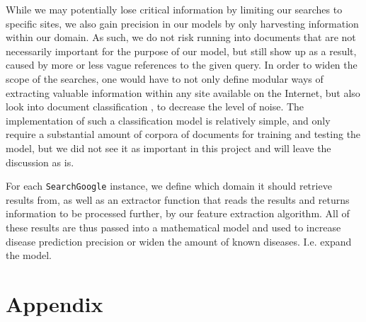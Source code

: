 \documentclass[10pt,letterpaper,final]{article}
\begin{document}
While we may potentially lose critical information by limiting our
searches to specific sites, we also gain precision in our models by only
harvesting information within our domain. As such, we do not risk
running into documents that are not necessarily important for the
purpose of our model, but still show up as a result, caused by more or
less vague references to the given query. In order to widen the scope of
the searches, one would have to not only define modular ways of
extracting valuable information within any site available on the
Internet, but also look into document classification \cite{Jimmy}, to
decrease the level of noise. The implementation of such a classification
model is relatively simple, and only require a substantial amount of
corpora of documents for training and testing the model, but we did not
see it as important in this project and will leave the discussion as is.


For each \texttt{SearchGoogle} instance, we define which domain it
should retrieve results from, as well as an extractor function that
reads the results and returns information to be processed further, by
our feature extraction algorithm. All of these results are thus passed
into a mathematical model and used to increase disease prediction
precision or widen the amount of known diseases. I.e. expand the model.


\appendix
\section{Appendix}

\renewcommand\bibname{References}


\end{document}
